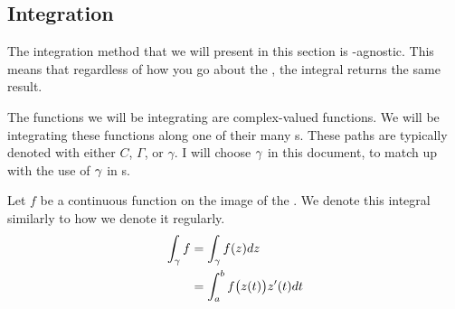\subsection{Integration}\label{subsec:Integration}
The integration method that we will present in this section is -agnostic.
This means that regardless of how you go about  the , the integral returns the same result.

The functions we will be integrating are complex-valued functions.
We will be integrating these functions along one of their many s.
These paths are typically denoted with either $C$, $\Gamma$, or $\gamma$.
I will choose $\gamma$ in this document, to match up with the use of $\gamma$ in s.

\begin{definition}\label{def:Integration_on_Paths}
  Let $f$ be a continuous function on the image of the .
  We denote this integral similarly to how we denote it regularly.
  \begin{equation}\label{eq:Integration_on_Paths}
    \begin{aligned}
      \int_{\gamma} f &= \int_{\gamma} f(z) dz \\
      &= \int_{a}^{b} f\bigl( z(t) \bigr) z'(t) dt
    \end{aligned}
  \end{equation}
\end{definition}


